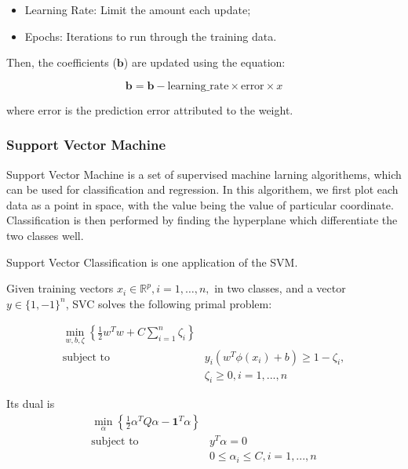 \documentclass[12pt,a4paper]{article}
\begin{document}
        \begin{itemize}
          \item{Learning Rate}: Limit the amount each update;
          \item{Epochs}: Iterations to run through the training data.
        \end{itemize}

        Then, the coefficients ($\mathbf{b}$) are updated using the equation:

        $$
          \mathbf{b} = \mathbf{b} - \text{learning\_rate} \times \text{error} \times x
        $$

        where $\text{error}$ is the prediction error attributed to the weight.


    \subsubsection{Support Vector Machine}

      Support Vector Machine is a set of supervised machine larning algorithems, which can be used for classification and regression. In this algorithem, we first plot each data as a point in space, with the value being the value of particular coordinate. Classification is then performed by finding the hyperplane which differentiate the two classes well.

      Support Vector Classification is one application of the SVM.

      Given training vectors $x_i \in \mathbb{R}^p, i=1, \dots, n,$ in two classes, and a vector $y \in \{1, -1\}^n$, SVC solves the following primal problem:

      \[
        \begin{aligned}
          \min_ {w, b, \zeta} \left\{ \frac{1}{2} w^T w + C \sum_{i=1}^{n} \zeta_i \right\} \\
          \textrm {subject to } & y_i (w^T \phi (x_i) + b) \geq 1 - \zeta_i,                \\
                                & \zeta_i \geq 0, i=1, ..., n
        \end{aligned}
      \]

      Its dual is
      $$
        \begin{aligned}
          \min_{\alpha} \left\{ \frac{1}{2} \alpha^T Q \alpha - \mathbf{1}^T \alpha \right\} \\
          \textrm {subject to } & y^T \alpha = 0                                             \\
                                & 0 \leq \alpha_i \leq C, i=1, ..., n
        \end{aligned}
      $$
\end{document}
